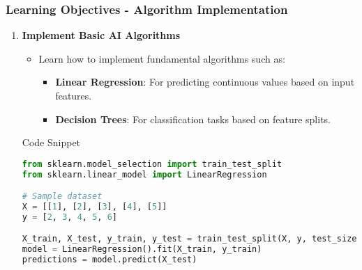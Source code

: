 \documentclass{beamer}
\begin{document}
\begin{frame}[fragile]
    \frametitle{Learning Objectives - Algorithm Implementation}
    \begin{enumerate}[resume]
        \item \textbf{Implement Basic AI Algorithms}
        \begin{itemize}
            \item Learn how to implement fundamental algorithms such as:
                \begin{itemize}
                    \item \textbf{Linear Regression}: For predicting continuous values based on input features.
                    \item \textbf{Decision Trees}: For classification tasks based on feature splits.
                \end{itemize}
        \end{itemize}
        \begin{block}{Code Snippet}
        \begin{lstlisting}[language=Python]
from sklearn.model_selection import train_test_split
from sklearn.linear_model import LinearRegression

# Sample dataset
X = [[1], [2], [3], [4], [5]]
y = [2, 3, 4, 5, 6]

X_train, X_test, y_train, y_test = train_test_split(X, y, test_size=0.2)
model = LinearRegression().fit(X_train, y_train)
predictions = model.predict(X_test)
        \end{lstlisting}
        \end{block}
    \end{enumerate}
\end{frame}
\end{document}
